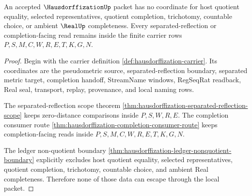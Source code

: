 \begin{theorem}
\label{thm:hausdorffization-nonquotient-nonescape-obligation}
An accepted $\HausdorffizationUp$ packet has no coordinate for host quotient equality, selected representatives, quotient completion, trichotomy, countable choice, or ambient $\RealUp$ completeness. Every separated-reflection or completion-facing read remains inside the finite carrier rows $P,S,M,C,W,R,E,T,K,G,N$.
\end{theorem}
\begin{proof}
Begin with the carrier definition \autoref{def:hausdorffization-carrier}. Its coordinates are the pseudometric source, separated-reflection boundary, separated metric target, completion handoff, StreamName windows, RegSeqRat readback, Real seal, transport, replay, provenance, and local naming rows.

The separated-reflection scope theorem \autoref{thm:hausdorffization-separated-reflection-scope} keeps zero-distance comparisons inside $P,S,W,R,E$. The completion consumer route \autoref{thm:hausdorffization-completion-consumer-route} keeps completion-facing reads inside $P,S,M,C,W,R,E,T,K,G,N$.

The ledger non-quotient boundary \autoref{thm:hausdorffization-ledger-nonquotient-boundary} explicitly excludes host quotient equality, selected representatives, quotient completion, trichotomy, countable choice, and ambient Real completeness. Therefore none of those data can escape through the local packet.
\end{proof}

